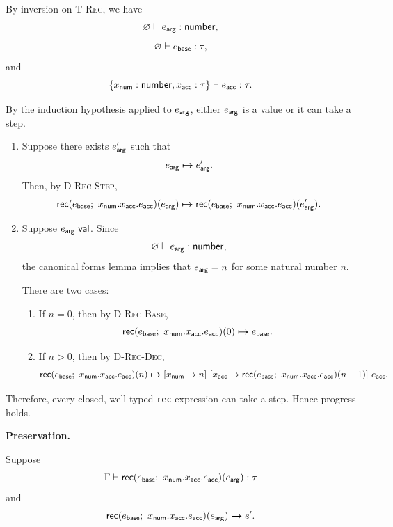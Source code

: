\documentclass[11pt]{article}
\begin{document}
By inversion on \textsc{T-Rec}, we have
\[
\varnothing \vdash e_{\mathsf{arg}} : \mathsf{number},
\]
\[
\varnothing \vdash e_{\mathsf{base}} : \tau,
\]
and
\[
\typeJ{
  \{\hasType{x_\msf{num}}{\tnum},
    \hasType{x_\msf{acc}}{\tau}\}}
  {e_\msf{acc}}
  {\tau}.
\]

By the induction hypothesis applied to $e_{\mathsf{arg}}$, either
$e_{\mathsf{arg}}$ is a value or it can take a step.

\begin{enumerate}
  \item Suppose there exists $e_{\mathsf{arg}}'$ such that
  \[
  e_{\mathsf{arg}} \boldsymbol{\mapsto} e_{\mathsf{arg}}'.
  \]
  Then, by \textsc{D-Rec-Step},
  \[
  \mathsf{rec}(e_{\mathsf{base}}; ~ x_{\mathsf{num}}.x_{\mathsf{acc}}.e_{\mathsf{acc}})(e_{\mathsf{arg}}) \boldsymbol{\mapsto} \mathsf{rec}(e_{\mathsf{base}}; ~ x_{\mathsf{num}}.x_{\mathsf{acc}}.e_{\mathsf{acc}})(e_{\mathsf{arg}}').
  \]

  \item Suppose $e_{\mathsf{arg}}~\mathsf{val}$. Since
  \[
  \varnothing \vdash e_{\mathsf{arg}} : \mathsf{number},
  \]
  the canonical forms lemma implies that
  $e_{\mathsf{arg}}=n$ for some natural number $n$.

  There are two cases:
  \begin{enumerate}
    \item If $n=0$, then by \textsc{D-Rec-Base},
    \[
    \mathsf{rec}(e_{\mathsf{base}}; ~ x_{\mathsf{num}}.x_{\mathsf{acc}}.e_{\mathsf{acc}})(0) \boldsymbol{\mapsto} e_{\mathsf{base}}.
    \]

    \item If $n>0$, then by \textsc{D-Rec-Dec},
    \[
    \mathsf{rec}(e_{\mathsf{base}}; ~ x_{\mathsf{num}}.x_{\mathsf{acc}}.e_{\mathsf{acc}})(n) \boldsymbol{\mapsto} [x_{\mathsf{num}} \rightarrow n] ~ 
        [x_{\mathsf{acc}} \rightarrow 
          \mathsf{rec}(e_{\mathsf{base}}; ~ x_{\mathsf{num}}.x_{\mathsf{acc}}.e_{\mathsf{acc}})(n-1)] ~ e_{\mathsf{acc}}.
    \]
  \end{enumerate}
\end{enumerate}

Therefore, every closed, well-typed \texttt{rec} expression can take
a step. Hence progress holds.


\bigskip
\textbf{Preservation.}

Suppose
\[
\Gamma \vdash 
  \mathsf{rec}(e_{\mathsf{base}}; ~ x_{\mathsf{num}}.x_{\mathsf{acc}}.e_{\mathsf{acc}})(e_{\mathsf{arg}})
 : \tau
\]
and
\[
\mathsf{rec}(e_{\mathsf{base}}; ~ x_{\mathsf{num}}.x_{\mathsf{acc}}.e_{\mathsf{acc}})(e_{\mathsf{arg}}) \boldsymbol{\mapsto} e'.
\]
\end{document}
